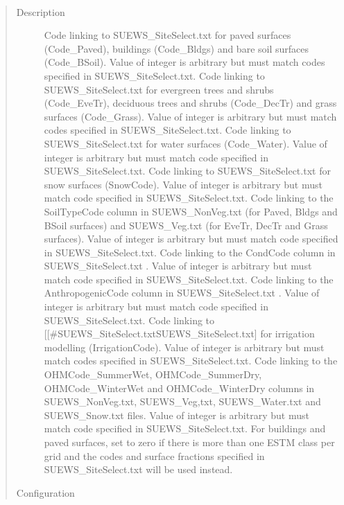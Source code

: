 \documentclass[letterpaper,10pt,english]{sphinxmanual}
\begin{document}

\begin{fulllineitems}
\label{\detokenize{input_files/SUEWS_SiteInfo/Input_Options:cmdoption-arg-code}}~\begin{quote}\begin{description}
\item[{Description}] \leavevmode
Code linking to SUEWS\_SiteSelect.txt for paved surfaces (Code\_Paved), buildings (Code\_Bldgs) and bare soil surfaces (Code\_BSoil). Value of integer is arbitrary but must match codes specified in SUEWS\_SiteSelect.txt.  Code linking to SUEWS\_SiteSelect.txt for evergreen trees and shrubs (Code\_EveTr), deciduous trees and shrubs (Code\_DecTr) and grass surfaces (Code\_Grass). Value of integer is arbitrary but must match codes specified in SUEWS\_SiteSelect.txt.  Code linking to SUEWS\_SiteSelect.txt for water surfaces (Code\_Water). Value of integer is arbitrary but must match code specified in SUEWS\_SiteSelect.txt.  Code linking to SUEWS\_SiteSelect.txt for snow surfaces (SnowCode). Value of integer is arbitrary but must match code specified in SUEWS\_SiteSelect.txt.  Code linking to the SoilTypeCode column in SUEWS\_NonVeg.txt (for Paved, Bldgs and BSoil surfaces) and SUEWS\_Veg.txt (for EveTr, DecTr and Grass surfaces). Value of integer is arbitrary but must match code specified in SUEWS\_SiteSelect.txt.  Code linking to the CondCode column in SUEWS\_SiteSelect.txt . Value of integer is arbitrary but must match code specified in SUEWS\_SiteSelect.txt.  Code linking to the AnthropogenicCode column in SUEWS\_SiteSelect.txt . Value of integer is arbitrary but must match code specified in SUEWS\_SiteSelect.txt.  Code linking to {[}{[}\#SUEWS\_SiteSelect.txt\textbar{}SUEWS\_SiteSelect.txt{]} for irrigation modelling (IrrigationCode). Value of integer is arbitrary but must match codes specified in SUEWS\_SiteSelect.txt.  Code linking to the OHMCode\_SummerWet, OHMCode\_SummerDry, OHMCode\_WinterWet and OHMCode\_WinterDry columns in SUEWS\_NonVeg.txt, SUEWS\_Veg,txt, SUEWS\_Water.txt and SUEWS\_Snow.txt files. Value of integer is arbitrary but must match code specified in SUEWS\_SiteSelect.txt.  For buildings and paved surfaces, set to zero if there is more than one ESTM class per grid and the codes and surface fractions specified in SUEWS\_SiteSelect.txt will be used instead.

\item[{Configuration}] \leavevmode


\end{description}
\end{quote}
\end{fulllineitems}
\end{document}
